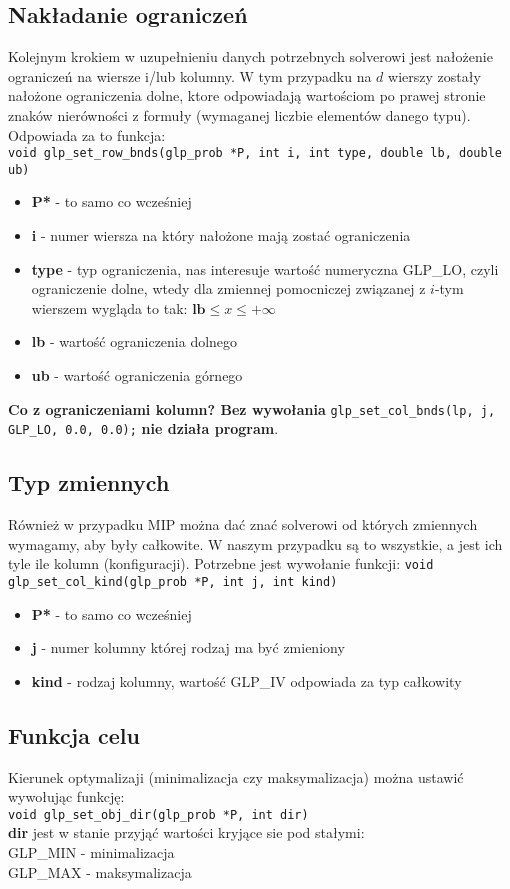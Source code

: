 \subsection{Nakładanie ograniczeń}
Kolejnym krokiem w uzupełnieniu danych potrzebnych solverowi jest nałożenie ograniczeń na  wiersze i/lub kolumny. W tym przypadku na $d$ wierszy zostały nałożone  ograniczenia dolne, ktore odpowiadają wartościom po prawej stronie znaków nierówności z formuły (wymaganej liczbie elementów danego typu). 
Odpowiada za to funkcja: \\
\verb|void glp_set_row_bnds(glp_prob *P, int i, int type, double lb, double ub)|
\begin{itemize}
	\item \textbf{P*} - to samo co wcześniej
	\item \textbf{i} - numer wiersza na który nałożone mają zostać ograniczenia
	\item \textbf{type} - typ ograniczenia, nas interesuje wartość numeryczna GLP\_LO, czyli ograniczenie dolne, wtedy dla zmiennej pomocniczej związanej z $i$-tym wierszem wygląda to tak: $\mathbf{lb} \leq x \le +\infty$
	\item \textbf{lb} - wartość ograniczenia dolnego
	\item \textbf{ub} - wartość ograniczenia górnego
\end{itemize}
\textbf{Co z ograniczeniami kolumn? Bez wywołania} \verb|glp_set_col_bnds(lp, j, GLP_LO, 0.0, 0.0);| \textbf{nie działa program}.

\subsection{Typ zmiennych}
Również w przypadku MIP można dać znać solverowi od których zmiennych wymagamy, aby były całkowite. W naszym przypadku są to wszystkie, a jest ich tyle ile kolumn (konfiguracji).
Potrzebne jest wywołanie funkcji:
\verb|void glp_set_col_kind(glp_prob *P, int j, int kind)|

\begin{itemize}
	\item \textbf{P*} - to samo co wcześniej
	\item \textbf{j} - numer kolumny której rodzaj ma być zmieniony
	\item \textbf{kind} - rodzaj kolumny, wartość GLP\_IV odpowiada za typ całkowity
\end{itemize}

\subsection{Funkcja celu}
Kierunek optymalizaji (minimalizacja czy maksymalizacja) można ustawić wywołując funkcję: \\
\verb|void glp_set_obj_dir(glp_prob *P, int dir)| \\
\textbf{dir} jest w stanie przyjąć wartości kryjące sie pod stałymi: \\
GLP\_MIN - minimalizacja \\
GLP\_MAX - maksymalizacja \\

